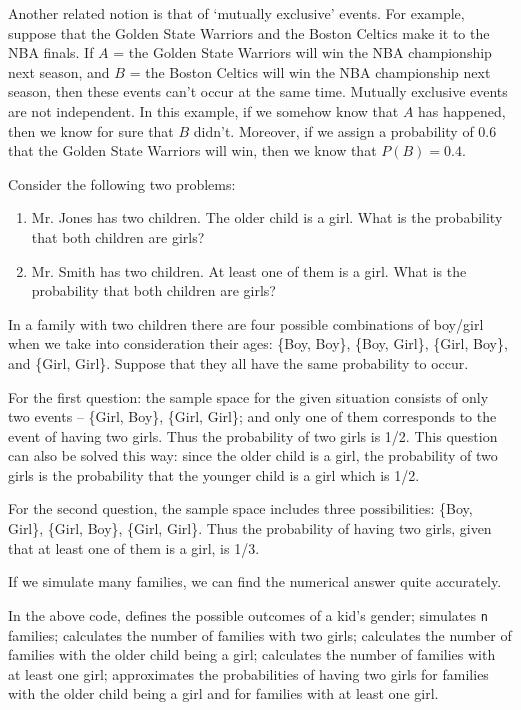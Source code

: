 Another related notion is that of `mutually exclusive' events. For example, suppose that
the Golden State Warriors and the Boston Celtics make it to the NBA finals. If
$A$ = the Golden State Warriors will win the NBA championship next season, and
$B$ = the Boston Celtics will win the NBA championship next season, then these
events can't occur at the same time. Mutually exclusive events are not independent. In
this example, if we somehow know that $A$ has happened, then we know for sure
that $B$ didn't. Moreover, if we assign a probability of 0.6 that the Golden
State Warriors will win, then we know that $P(B) = 0.4$. 

\begin{example}
Consider the following two problems:
\begin{enumerate}
\item Mr. Jones has two children. The older child is a girl. What is the
  probability that both children are girls?
\item Mr. Smith has two children. At least one of them is a girl. What is the
  probability that both children are girls?
\end{enumerate}
\end{example}
In a family with two children there are four possible combinations of boy/girl
when we take into consideration their ages: \{Boy, Boy\}, \{Boy, Girl\}, \{Girl,
Boy\}, and \{Girl, Girl\}. Suppose that they all have the same probability to
occur.

For the first question: the sample space for the given situation consists of
only two events -- \{Girl, Boy\}, \{Girl, Girl\}; and only one of them
corresponds to the event of having two girls. Thus the
probability of two girls is 1/2. This question can also be solved this
way: since the older child is a girl, the probability of two girls is the
probability that the younger child is a girl which is 1/2.

For the second question, the sample space includes three possibilities: \{Boy,
Girl\}, \{Girl, Boy\}, \{Girl, Girl\}. Thus the
probability of having two girls, given that at least one of them is a girl, is 1/3.

If we simulate many families, we can find the numerical answer quite accurately.

In the above code,  defines the possible outcomes of a kid's gender; 
 simulates \lstinline{n} families; 
 calculates the number of families with two girls;
 calculates the number of families with the older child being a girl;
 calculates the number of families with at least one girl;
 approximates the probabilities of having two girls for families
with the older child being a girl and for families with at least one girl.

